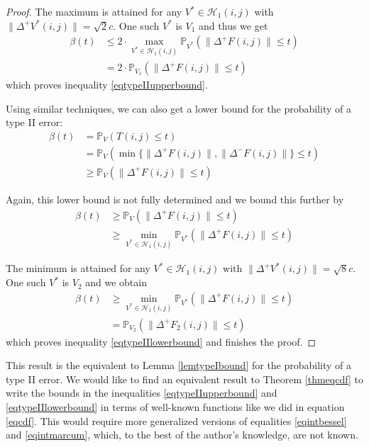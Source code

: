\documentclass[a4paper,12pt]{article}
\newcommand{\norm}[1]{\lVert#1\rVert}
\theoremstyle{plain}
\theoremstyle{definition}
\begin{document}
\begin{proof}
	The maximum is attained for any $V^* \in \mathcal{H}_1(i, j)$ with $\norm{\Delta^+ V^*(i, j)} = \sqrt{2} c$. One such $V^*$ is $V_1$ and thus we get
	\begin{align*}
		\beta(t) &\leq 2 \cdot \max_{V^* \in \mathcal{H}_1(i, j)} \mathbb{P}_{V^*}( \norm{\Delta^+ F(i, j)} \leq t ) \\
		&= 2 \cdot \mathbb{P}_{V_1}( \norm{\Delta^+ F(i, j)} \leq t )
	\end{align*}
	which proves inequality \eqref{eqtypeIIupperbound}.
	
	Using similar techniques, we can also get a lower bound for the probability of a type II error:
	\begin{align*}
		\beta(t) &= \mathbb{P}_V( T(i, j) \leq t ) \\
		&= \mathbb{P}_V( \min \{ \norm{\Delta^+ F(i, j)}, \norm{\Delta^- F(i, j)} \} \leq t ) \\
		&\geq \mathbb{P}_V( \norm{\Delta^+ F(i, j)} \leq t )
	\end{align*}
	
	Again, this lower bound is not fully determined and we bound this further by
	\begin{align*}
		\beta(t) &\geq \mathbb{P}_V( \norm{\Delta^+ F(i, j)} \leq t ) \\
		&\geq \min_{V^* \in \mathcal{H}_1(i, j)} \mathbb{P}_{V^*}( \norm{\Delta^+ F(i, j)} \leq t )
	\end{align*}
	
	The minimum is attained for any $V^* \in \mathcal{H}_1(i, j)$ with $\norm{\Delta^+ V^*(i, j)} = \sqrt{8} c$. One such $V^*$ is $V_2$ and we obtain
	\begin{align*}
		\beta(t) &\geq \min_{V^* \in \mathcal{H}_1(i, j)} \mathbb{P}_{V^*}( \norm{\Delta^+ F(i, j)} \leq t ) \\
		&= \mathbb{P}_{V_2}( \norm{\Delta^+ F_2(i, j)} \leq t )
	\end{align*}
	which proves inequality \eqref{eqtypeIIlowerbound} and finishes the proof.
\end{proof}

This result is the equivalent to Lemma \ref{lemtypeIbound} for the probability of a type II error. We would like to find an equivalent result to Theorem \ref{thmeqcdf} to write the bounds in the inequalities \eqref{eqtypeIIupperbound} and \eqref{eqtypeIIlowerbound} in terms of well-known functions like we did in equation \eqref{eqcdf}. This would require more generalized versions of equalities \eqref{eqintbessel} and \eqref{eqintmarcum}, which, to the best of the author's knowledge, are not known.
\end{document}
